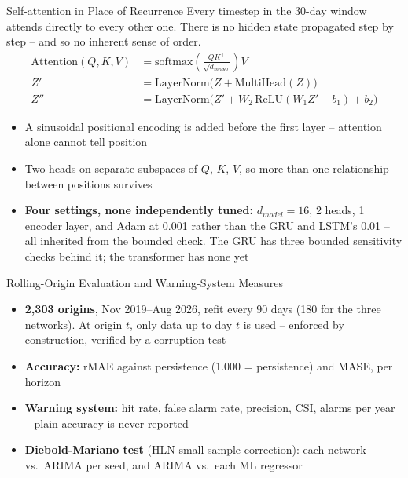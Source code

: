 \documentclass[12pt,aspectratio=169]{beamer}
\begin{document}
\begin{frame}{Self-attention in Place of Recurrence}
  \footnotesize
  Every timestep in the 30-day window attends directly to every other
  one. There is no hidden state propagated step by step -- and so no
  inherent sense of order.
  \begin{align*}
    \mathrm{Attention}(Q,K,V) &= \mathrm{softmax}\!\left(
      \frac{QK^\top}{\sqrt{d_{model}}}\right) V\\
    Z' &= \mathrm{LayerNorm}\big(Z + \mathrm{MultiHead}(Z)\big)\\
    Z'' &= \mathrm{LayerNorm}\big(Z' + W_2\,\mathrm{ReLU}(W_1 Z' + b_1)
      + b_2\big)
  \end{align*}
  \begin{itemize}
    \item A sinusoidal positional encoding is added before the first
      layer -- attention alone cannot tell position
    \item Two heads on separate subspaces of $Q$, $K$, $V$, so more than
      one relationship between positions survives
    \item \textbf{Four settings, none independently tuned:}
      $d_{model}=16$, 2 heads, 1 encoder layer, and Adam at 0.001 rather
      than the GRU and LSTM's 0.01 -- all inherited from the bounded
      check. The GRU has three bounded sensitivity checks behind it; the
      transformer has none yet
  \end{itemize}
\end{frame}

\begin{frame}{Rolling-Origin Evaluation and Warning-System Measures}
  \begin{itemize}
    \item \textbf{2{,}303 origins}, Nov 2019--Aug 2026, refit every 90
      days (180 for the three networks). At origin $t$, only data up to day $t$ is
      used -- enforced by construction, verified by a corruption test
    \item \textbf{Accuracy:} rMAE against persistence (1.000 =
      persistence) and MASE, per horizon
    \item \textbf{Warning system:} hit rate, false alarm rate, precision,
      CSI, alarms per year -- plain accuracy is never reported
    \item \textbf{Diebold-Mariano test} (HLN small-sample correction):
      each network vs.\ ARIMA per seed, and ARIMA vs.\ each ML regressor
  \end{itemize}
\end{frame}
\end{document}
